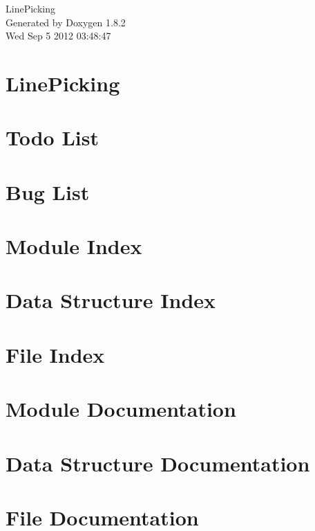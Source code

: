 \documentclass{book}
\begin{document}
\hypersetup{pageanchor=false,citecolor=blue}
\begin{titlepage}
\vspace*{7cm}
\begin{center}
{\Large Line\-Picking }\\
\vspace*{1cm}
{\large Generated by Doxygen 1.8.2}\\
\vspace*{0.5cm}
{\small Wed Sep 5 2012 03:48:47}\\
\end{center}
\end{titlepage}
\clearemptydoublepage
{}
\tableofcontents
\clearemptydoublepage
{}
\hypersetup{pageanchor=true,citecolor=blue}
\chapter{Line\-Picking}
\label{index}\hypertarget{index}{}
\chapter{Todo List}
\label{todo}
\hypertarget{todo}{}

\chapter{Bug List}
\label{bug}
\hypertarget{bug}{}

\chapter{Module Index}

\chapter{Data Structure Index}

\chapter{File Index}

\chapter{Module Documentation}

\chapter{Data Structure Documentation}


\chapter{File Documentation}
















\printindex
\end{document}
